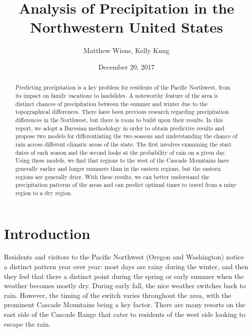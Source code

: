 \documentclass{article}
\begin{document}
\title{Analysis of Precipitation in the Northwestern United States}
\author{Matthew Wiens, Kelly Kung}
\date{December 20, 2017}
\maketitle
\begin{abstract}

Predicting precipitation is a key problem for residents of the Pacific Northwest, from its impact on family vacations to landslides. A noteworthy feature of the area is distinct chances of precipitation between the summer and winter due to the topographical differences. There have been previous research regarding precipitation differences in the Northwest, but there is room to build upon their results. In this report, we adopt a Bayesian methodology in order to obtain predictive results and propose two models for differentiating the two seasons and understanding the chance of rain across different climatic areas of the state. The first involves examining the start dates of each season and the second looks at the probability of rain on a given day. Using these models, we find that regions to the west of the Cascade Mountains have generally earlier and longer summers than in the eastern regions, but the eastern regions are generally drier. With these results, we can better understand the precipitation patterns of the areas and can predict optimal times to travel from a rainy region to a dry region. 

\end{abstract}

\section{Introduction}

Residents and visitors to the Pacific Northwest (Oregon and Washington) notice a distinct pattern year over year: most days are rainy during the winter, and then they feel that there a distinct point during the spring or early summer when the weather becomes mostly dry. During early fall, the nice weather switches back to rain.  However, the timing of the switch varies throughout the area, with the prominent Cascade Mountains being a key factor. There are many resorts on the east side of the Cascade Range that cater to residents of the west side looking to escape the rain. 
\end{document}
